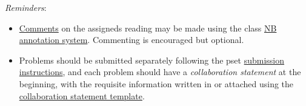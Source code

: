 \documentclass[handout]{mcs}
\begin{document}
\renewcommand{\reading}{
Part~\bref{part:proofs}{. \emph{Proofs:
      Introduction}}, Chapter~\bref{proofs_chap}{, \emph{What is a
      Proof?}}; Chapter~\bref{well_ordering_chap}{, \emph{The Well
      Ordering Principle}}.  These
  assigned readings \textbf{do not include the Problem sections}.  (Many
  of the problems in the text will appear as class or homework problems.)}


\emph{Reminders}:
\begin{itemize}
\item 
  \href{http://courses.csail.mit.edu/6.042/spring13/courseinfo#comments}{Comments}
  on the assigneds reading may be made using the class
  \href{http://nb.csail.mit.edu}{NB annotation system}.  Commenting is
  encouraged but optional.

\item Problems should be submitted separately following the pset
  \href{http://courses.csail.mit.edu/6.042/spring13/submission}{submission
    instructions}, and each problem should have a \emph{collaboration
    statement} at the beginning, with the requisite information
  written in or attached using the
  \href{http://courses.csail.mit.edu/6.042/spring13/submission_template.pdf}{collaboration
    statement template}.

 \end{itemize}











\iffalse
\begin{center}
\large \textbf{Optional:}
\end{center}

\pinput{PS_faster_adder_logic}
\fi

\end{document}
